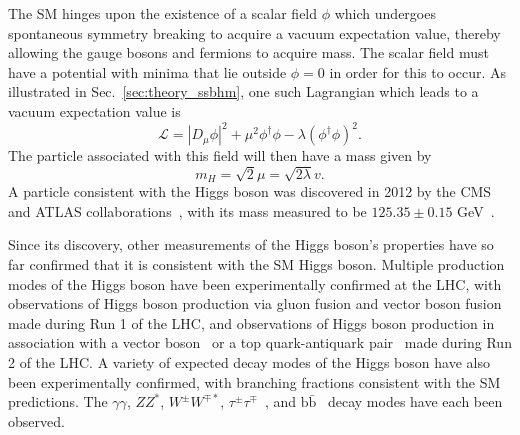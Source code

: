 The SM hinges upon the existence of a scalar field $\phi$ which undergoes spontaneous symmetry breaking to acquire a vacuum expectation value, thereby allowing the gauge bosons and fermions to acquire mass.
The scalar field must have a potential with minima that lie outside $\phi = 0$ in order for this to occur.
As illustrated in Sec.~\ref{sec:theory_ssbhm}, one such Lagrangian which leads to a vacuum expectation value is
\begin{equation}
    \mathcal L = |D_\mu \phi|^2 + \mu^2 \phi^\dagger \phi - \lambda (\phi^\dagger \phi)^2.
\end{equation}
The particle associated with this field will then have a mass given by
\begin{equation}
    m_H = \sqrt{2} \mu = \sqrt{2 \lambda} v.
\end{equation}
A particle consistent with the Higgs boson was discovered in 2012 by the CMS and ATLAS collaborations~\cite{Aad:2012tfa,Chatrchyan:2012xdj,Chatrchyan:2013lba}, with its mass measured to be $125.35 \pm 0.15$ GeV~\cite{CMS:2019drq}.

Since its discovery, other measurements of the Higgs boson's properties have so far confirmed that it is consistent with the SM Higgs boson.
Multiple production modes of the Higgs boson have been experimentally confirmed at the LHC, with observations of Higgs boson production via gluon fusion and vector boson fusion~\cite{Aad:2013wqa,Khachatryan:2014jba,Khachatryan:2016vau} made during Run 1 of the LHC, and observations of Higgs boson production in association with a vector boson~\cite{Aaboud:2018zhk} or a top quark-antiquark pair~\cite{Sirunyan:2018hoz} made during Run 2 of the LHC.
A variety of expected decay modes of the Higgs boson have also been experimentally confirmed, with branching fractions consistent with the SM predictions.
The $\gamma \gamma$, $ZZ^*$, $W^\pm W^{\mp*}$, $\tau^\pm \tau^\mp$~\cite{Aad:2013wqa,Khachatryan:2014jba,Khachatryan:2016vau}, and $\text{b}\bar{\text{b}}$~\cite{Aaboud:2018zhk} decay modes have each been observed. 


